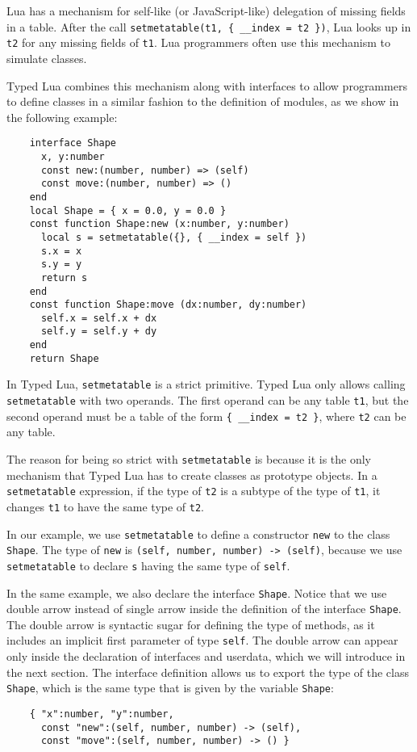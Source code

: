Lua has a mechanism for self-like (or JavaScript-like) delegation of
missing fields in a table.
After the call \texttt{setmetatable(t1, \{ \string_\string_index = t2 \})},
Lua looks up in \texttt{t2} for any missing fields of \texttt{t1}.
Lua programmers often use this mechanism to simulate classes.

Typed Lua combines this mechanism along with interfaces to allow
programmers to define classes in a similar fashion to the definition
of modules, as we show in the following example:
\begin{verbatim}
    interface Shape
      x, y:number
      const new:(number, number) => (self)
      const move:(number, number) => ()
    end
    local Shape = { x = 0.0, y = 0.0 }
    const function Shape:new (x:number, y:number)
      local s = setmetatable({}, { __index = self })
      s.x = x
      s.y = y
      return s
    end
    const function Shape:move (dx:number, dy:number)
      self.x = self.x + dx
      self.y = self.y + dy
    end
    return Shape
\end{verbatim}

In Typed Lua, \texttt{setmetatable} is a strict primitive.
Typed Lua only allows calling \texttt{setmetatable} with
two operands.
The first operand can be any table \texttt{t1}, but the second operand
must be a table of the form \texttt{\{ \string_\string_index = t2 \}},
where \texttt{t2} can be any table.

The reason for being so strict with \texttt{setmetatable} is because
it is the only mechanism that Typed Lua has to create classes
as prototype objects.
In a \texttt{setmetatable} expression, if the type of \texttt{t2}
is a subtype of the type of \texttt{t1}, it changes \texttt{t1} to
have the same type of \texttt{t2}.

In our example, we use \texttt{setmetatable} to define a constructor
\texttt{new} to the class \texttt{Shape}.
The type of \texttt{new} is \texttt{(self, number, number) -> (self)},
because we use \texttt{setmetatable} to declare \texttt{s} having
the same type of \texttt{self}.

In the same example, we also declare the interface \texttt{Shape}.
Notice that we use double arrow instead of single arrow inside the
definition of the interface \texttt{Shape}.
The double arrow is syntactic sugar for defining the type of methods,
as it includes an implicit first parameter of type \texttt{self}.
The double arrow can appear only inside the declaration of
interfaces and userdata, which we will introduce in the next section.
The interface definition allows us to export the type of the class \texttt{Shape},
which is the same type that is given by the variable \texttt{Shape}:
\begin{verbatim}
    { "x":number, "y":number,
      const "new":(self, number, number) -> (self),
      const "move":(self, number, number) -> () }
\end{verbatim}

